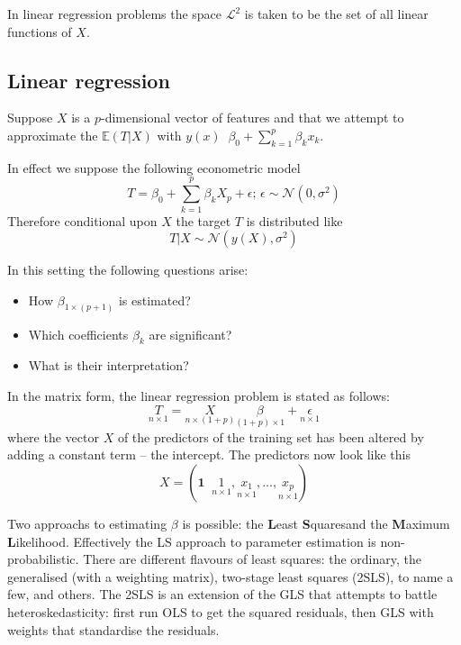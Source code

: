 \documentclass[a4paper]{article}
\newcommand{\brac}[1]{{\left ( #1 \right )}}
\newcommand{\induc}[1]{{\left . #1 \right \vert}}
\newcommand{\Ncal}{\mathcal{N}}
\newcommand{\Lcal}{\mathcal{L}}
\newcommand{\Ex}[0]{{\mathbb{E}}}
\newcommand{\one}{\mathbf{1}}
\newcommand{\defn}{\mathop{\overset{\Delta}{=}}\nolimits}
\begin{document}
In linear regression problems the space $\Lcal^2$ is taken to be the set of all linear functions of $X$.

\subsection*{Linear regression} %
\label{sub:linear_regression}

Suppose $X$ is a $p$-dimensional vector of features and that we attempt to approximate the $\Ex\brac{\induc{T}X}$ with $y(x) \defn \beta_0 + \sum_{k=1}^p \beta_k x_k$.

In effect we suppose the following econometric model
\[T = \beta_0 + \sum_{k=1}^p \beta_k X_p + \epsilon;\,\epsilon\sim\Ncal(0,\sigma^2)\]
Therefore conditional upon $X$ the target $T$ is distributed like \[\induc{T}X\sim \Ncal(y(X),\sigma^2)\]

In this setting the following questions arise: \begin{itemize}
	\item How $\beta_{1\times(p+1)}$ is estimated?
	\item Which coefficients $\beta_k$ are significant?
	\item What is their interpretation?
\end{itemize}

In the matrix form, the linear regression problem is stated as follows:
\[\underset{n\times 1}{T} = \underset{n\times (1+p)}{X}\underset{(1+p)\times 1}{\beta} + \underset{n\times 1}{\epsilon}\]
where the vector $X$ of the predictors of the training set has been altered by adding a constant term -- the intercept. The predictors now look like this
\[X = \brac{ \one \defn \underset{n\times 1}{1}, \underset{n\times 1}{x_1}, \ldots, \underset{n\times 1}{x_p} }\]

Two approachs to estimating $\beta$ is possible: the \textbf{L}east \textbf{S}quares\footnotemark  and the \textbf{M}aximum \textbf{L}ikelihood.
Effectively the LS approach to parameter estimation is non-probabilistic.
There are different flavours of least squares: the ordinary, the generalised (with a weighting matrix), two-stage least squares (2SLS), to name a few, and others.
The 2SLS is an extension of the GLS that attempts to battle heteroskedasticity:
first run OLS to get the squared residuals, then GLS with weights that standardise the residuals.
\end{document}
